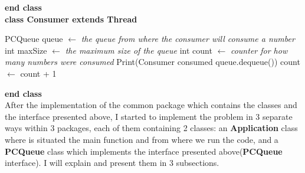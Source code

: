 \documentclass[14pt]{article}
\begin{document}
\textbf{end class}
\vspace{2.5 mm}
\\\textbf{class Consumer extends Thread}
\begin{algorithmic}
\State PCQueue queue $\gets$ \textit{the queue from where the consumer will consume a number}
\State int maxSize $\gets$ \textit{the maximum size of the queue}
\State int count $\gets$ \textit{counter for how many numbers were consumed}
        \State Print(Consumer consumed queue.dequeue())
        \State count $\gets$ count + 1
    \EndFor
\EndFunction
\end{algorithmic}
\textbf{end class}
\vspace{2.5 mm}
\\After the implementation of the common package which contains the classes and the interface presented above, I started to implement the problem in 3 separate ways within 3 packages, each of them containing 2 classes: an \textbf{Application} class where is situated the main function and from where we run the code, and a \textbf{PCQueue} class which implements the interface presented above(\textbf{PCQueue} interface). I will explain and present them in 3 subsections.
\end{document}
